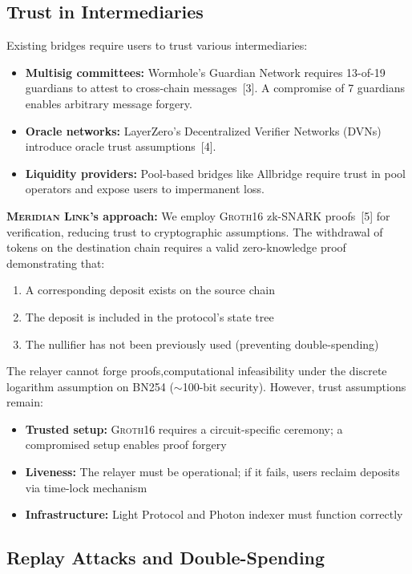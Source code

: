 \documentclass[11pt,a4paper,twoside]{article}
\newcommand{\protocol}{\textsc{Meridian Link}}
\newcommand{\groth}{\textsc{Groth16}}
\begin{document}
\subsection{Trust in Intermediaries}

Existing bridges require users to trust various intermediaries:

\begin{itemize}
    \item \textbf{Multisig committees:} Wormhole's Guardian Network requires 13-of-19 guardians to attest to cross-chain messages~[3]. A compromise of 7 guardians enables arbitrary message forgery.
    \item \textbf{Oracle networks:} LayerZero's Decentralized Verifier Networks (DVNs) introduce oracle trust assumptions~[4].
    \item \textbf{Liquidity providers:} Pool-based bridges like Allbridge require trust in pool operators and expose users to impermanent loss.
\end{itemize}

\textbf{\protocol{}'s approach:} We employ \groth{} zk-SNARK proofs~[5] for verification, reducing trust to cryptographic assumptions. The withdrawal of tokens on the destination chain requires a valid zero-knowledge proof demonstrating that:
\begin{enumerate}
    \item A corresponding deposit exists on the source chain
    \item The deposit is included in the protocol's state tree
    \item The nullifier has not been previously used (preventing double-spending)
\end{enumerate}

The relayer cannot forge proofs,computational infeasibility under the discrete logarithm assumption on BN254 ($\sim$100-bit security). However, trust assumptions remain:
\begin{itemize}
    \item \textbf{Trusted setup:} \groth{} requires a circuit-specific ceremony; a compromised setup enables proof forgery
    \item \textbf{Liveness:} The relayer must be operational; if it fails, users reclaim deposits via time-lock mechanism
    \item \textbf{Infrastructure:} Light Protocol and Photon indexer must function correctly
\end{itemize}

\subsection{Replay Attacks and Double-Spending}
\end{document}
